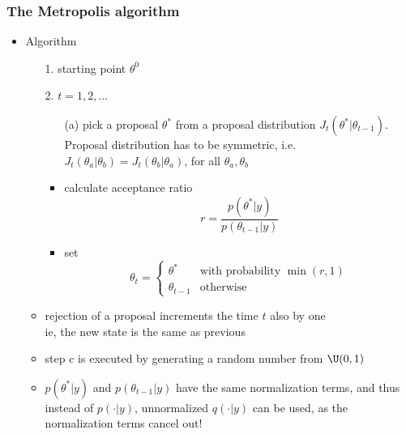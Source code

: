 \documentclass[10pt]{beamer}
\begin{document}
\begin{frame}

\frametitle{The Metropolis algorithm}

  \begin{itemize}
  \item Algorithm
    \begin{itemize}
      \item[1.] starting point $\theta^0$
      \item[2.] $t=1,2,\ldots$
        \begin{itemize}
        \item[(a)] pick a proposal $\theta^{*}$ from a {\color{uured} proposal distribution}
          $J_t(\theta^{*}|\theta_{t-1})$. \\
          Proposal distribution has to be symmetric, i.e.\\
          $J_t(\theta_a|\theta_b)=J_t(\theta_b|\theta_a)$, for all
          $\theta_a,\theta_b$
        \item<2->[(b)] calculate acceptance ratio
          \begin{equation*}
            r=\frac{p(\theta^{*}|y)}{p(\theta_{t-1}|y)}
          \end{equation*}
          \vspace{-6mm}
        \item<3->[(c)] set
          \begin{equation*}
            \theta_t=
            \begin{cases}
              \theta^{*} & \text{with probability $\min(r,1)$}\\
              \theta_{t-1} & \text{otherwise}
            \end{cases}
          \end{equation*}
      \end{itemize}
      \vspace{-1.5\baselineskip}
    \item<5-> rejection of a proposal increments the time $t$ also by one\\
      ie, the new state is the same as previous
      \item<6-> step c is executed by generating a random number from
        $\U(0,1)$
      \item<7-> $p(\theta^*|y)$ and $p(\theta_{t-1}|y)$ have the same
        normalization terms, and thus instead of $p(\cdot|y)$,
        unnormalized $q(\cdot|y)$ can be used, { \color{uured} as the normalization terms cancel out}!
    \end{itemize}
  \end{itemize}

\end{frame}
\end{document}
